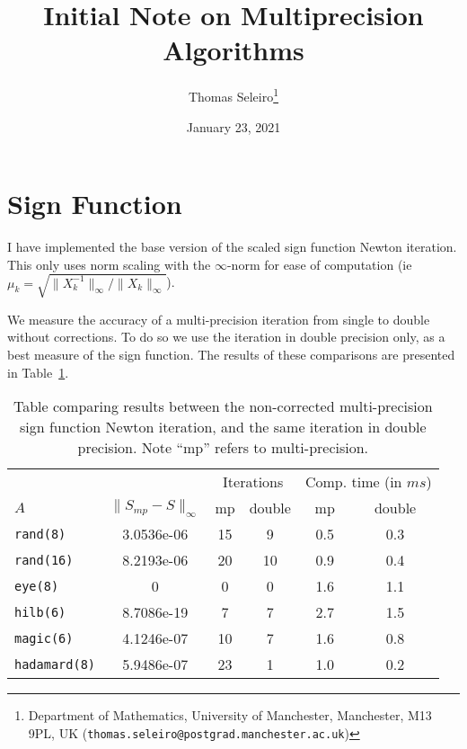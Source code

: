 \documentclass[10pt, A4paper]{article}
\begin{document}
\title{Initial Note on Multiprecision Algorithms}
\author{Thomas Seleiro\thanks
	{Department of Mathematics, University of Manchester, 
	Manchester, M13 9PL, UK
	(\texttt{thomas.seleiro@postgrad.manchester.ac.uk})}}
\date{January 23, 2021}
\maketitle

\section{Sign Function}

I have implemented the base version of the scaled sign function Newton 
iteration. This only uses norm scaling with the $\infty$-norm for ease 
of computation (ie $\mu_k = \sqrt{\|X_k^{-1}\|_{\infty} / 
\|X_k\|_{\infty}}$).

We measure the accuracy of a multi-precision iteration from single to 
double without corrections.
To do so we use the iteration in double precision only, as a best 
measure of the sign function.
The results of these comparisons are presented in 
Table~\ref{tab:noCorrectionMultiSign}.

\begin{table}[t]
	\centering
	\begin{tabular}{lccccc}
		\toprule
		& & \multicolumn{2}{c}{Iterations} & \multicolumn{2}{c}{Comp. 
			time (in $ms$)} \\
		\cmidrule(lr){3-4} \cmidrule(lr){5-6}
		$A$ & $\|S_{mp} - S\|_\infty$ & mp & double & mp & double \\
		\midrule
		\texttt{rand(8)}     & 3.0536e-06 & 15 & 9 & 0.5 & 0.3 \\
		\texttt{rand(16)}    & 8.2193e-06 & 20 & 10 & 0.9 & 0.4 \\
		\texttt{eye(8)}      & 0          & 0  & 0  & 1.6 & 1.1 \\
		\texttt{hilb(6)}	 & 8.7086e-19 & 7  & 7  & 2.7 & 1.5 \\
		\texttt{magic(6)}	 & 4.1246e-07 & 10 & 7  & 1.6 & 0.8 \\
		\texttt{hadamard(8)} & 5.9486e-07 & 23 & 1  & 1.0 & 0.2 \\
		\bottomrule
	\end{tabular}
	\caption{Table comparing results between the non-corrected 
	multi-precision sign function Newton iteration, and the same 
	iteration in double precision.
	Note ``mp'' refers to multi-precision. 
	\label{tab:noCorrectionMultiSign}}
\end{table}
\end{document}
